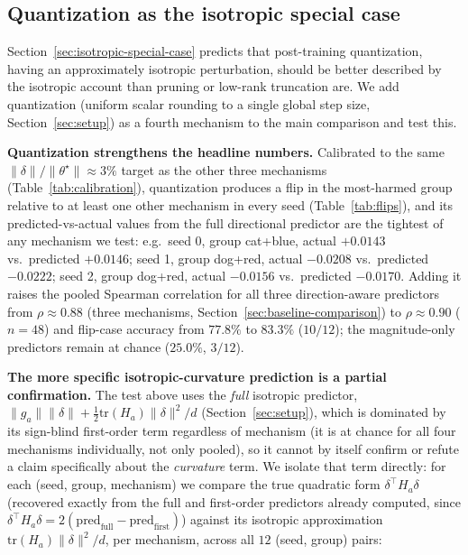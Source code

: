 \documentclass{article}
\newcommand{\theorig}{\theta^\star}
\begin{document}
\subsection{Quantization as the isotropic special case}
\label{app:quantization}

Section~\ref{sec:isotropic-special-case} predicts that post-training quantization, having an approximately isotropic perturbation, should be better described by the isotropic account than pruning or low-rank truncation are. We add quantization (uniform scalar rounding to a single global step size, Section~\ref{sec:setup}) as a fourth mechanism to the main comparison and test this.

\textbf{Quantization strengthens the headline numbers.} Calibrated to the same $\|\delta\|/\|\theorig\|\approx3\%$ target as the other three mechanisms (Table~\ref{tab:calibration}), quantization produces a flip in the most-harmed group relative to at least one other mechanism in every seed (Table~\ref{tab:flips}), and its predicted-vs-actual values from the full directional predictor are the tightest of any mechanism we test: e.g.\ seed 0, group cat+blue, actual $+0.0143$ vs.\ predicted $+0.0146$; seed 1, group dog+red, actual $-0.0208$ vs.\ predicted $-0.0222$; seed 2, group dog+red, actual $-0.0156$ vs.\ predicted $-0.0170$. Adding it raises the pooled Spearman correlation for all three direction-aware predictors from $\rho\approx0.88$ (three mechanisms, Section~\ref{sec:baseline-comparison}) to $\rho\approx0.90$ ($n=48$) and flip-case accuracy from $77.8\%$ to $83.3\%$ ($10/12$); the magnitude-only predictors remain at chance ($25.0\%$, $3/12$).

\textbf{The more specific isotropic-curvature prediction is a partial confirmation.} The test above uses the \emph{full} isotropic predictor, $\|g_a\|\|\delta\| + \tfrac12\mathrm{tr}(H_a)\|\delta\|^2/d$ (Section~\ref{sec:setup}), which is dominated by its sign-blind first-order term regardless of mechanism (it is at chance for all four mechanisms individually, not only pooled), so it cannot by itself confirm or refute a claim specifically about the \emph{curvature} term. We isolate that term directly: for each (seed, group, mechanism) we compare the true quadratic form $\delta^\top H_a\delta$ (recovered exactly from the full and first-order predictors already computed, since $\delta^\top H_a\delta = 2(\text{pred}_{\text{full}} - \text{pred}_{\text{first}})$) against its isotropic approximation $\mathrm{tr}(H_a)\|\delta\|^2/d$, per mechanism, across all $12$ (seed, group) pairs:
\end{document}
